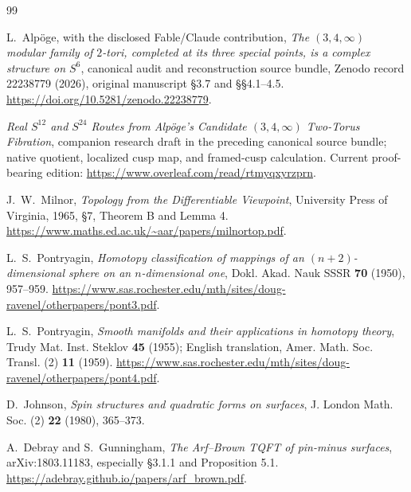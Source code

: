 \documentclass[11pt,letterpaper]{article}
\numberwithin{equation}{section}
\theoremstyle{definition}
\theoremstyle{remark}
\begin{document}
\begingroup
\sloppy
\raggedright
\renewcommand{\refname}{Supplementary references for the retained-angle and Hopf--cusp proofs}
\begin{thebibliography}{99}

L.~Alp\"oge, with the disclosed Fable/Claude contribution,
\emph{The \((3,4,\infty)\) modular family of \(2\)-tori, completed at
its three special points, is a complex structure on \(S^6\)},
canonical audit and reconstruction source bundle, Zenodo record 22238779
(2026), original manuscript \S3.7 and \S\S4.1--4.5.
\url{https://doi.org/10.5281/zenodo.22238779}.

\emph{Real \(S^{12}\) and \(S^{24}\) Routes from Alp\"oge's
Candidate \((3,4,\infty)\) Two-Torus Fibration},
companion research draft in the preceding canonical source bundle;
native quotient, localized cusp map, and framed-cusp calculation.
Current proof-bearing edition:
\url{https://www.overleaf.com/read/rtmyqxyrzprn}.

J.~W.~Milnor, \emph{Topology from the Differentiable Viewpoint},
University Press of Virginia, 1965, \S7, Theorem B and Lemma 4.
\url{https://www.maths.ed.ac.uk/~aar/papers/milnortop.pdf}.

L.~S.~Pontryagin,
\emph{Homotopy classification of mappings of an \((n+2)\)-dimensional
sphere on an \(n\)-dimensional one},
Dokl. Akad. Nauk SSSR \textbf{70} (1950), 957--959.
\url{https://www.sas.rochester.edu/mth/sites/doug-ravenel/otherpapers/pont3.pdf}.

L.~S.~Pontryagin,
\emph{Smooth manifolds and their applications in homotopy theory},
Trudy Mat. Inst. Steklov \textbf{45} (1955);
English translation, Amer. Math. Soc. Transl. (2) \textbf{11} (1959).
\url{https://www.sas.rochester.edu/mth/sites/doug-ravenel/otherpapers/pont4.pdf}.

D.~Johnson, \emph{Spin structures and quadratic forms on surfaces},
J. London Math. Soc. (2) \textbf{22} (1980), 365--373.

A.~Debray and S.~Gunningham,
\emph{The Arf--Brown TQFT of pin-minus surfaces},
arXiv:1803.11183, especially \S3.1.1 and Proposition 5.1.
\url{https://adebray.github.io/papers/arf_brown.pdf}.


\end{thebibliography}
\end{document}

